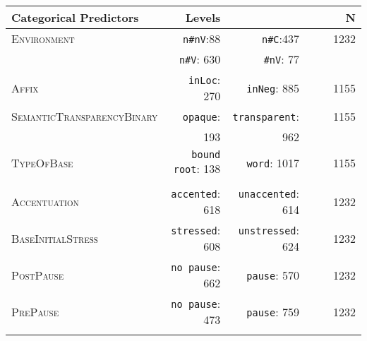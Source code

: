 \begin{table}
{\begin{tabular}{lrrrrr}
				\midrule
				\textbf{Categorical Predictors }& Levels &   &  & &N  \\ 
				\midrule
				\textsc{Environment}       & \texttt{n\#nV}:88  &   \texttt{n\#C}:437   & && 1232\\ 
				& \texttt{n\#V}: 630  & \texttt{\#nV}: 77  &&& \\ 		
				\textsc{Affix}        &\texttt{inLoc}: 270 & \texttt{inNeg}: 885 & &&1155 \\ 	
				\textsc{SemanticTransparencyBinary}        & \texttt{opaque}: & \texttt{transparent}: && & 1155\\ 
				& 193& 962&& & \\ 
				\textsc{TypeOfBase}        &\texttt{ bound root}: 138& \texttt{ word}: 1017& &&  1155\\ 	
				&& & && \\ 			
				\textsc{Accentuation}       &\texttt{accented}: 618 & \texttt{unaccented}: 614 & && 1232 \\ 
				\textsc{BaseInitialStress}       &\texttt{stressed}: 608 & \texttt{unstressed}: 624 & & & 1232\\ 		
				\textsc{PostPause}       &\texttt{no pause}: 662 & \texttt{pause}: 570 & && 1232 \\ 
				\textsc{PrePause}       &\texttt{no pause}: 473 & \texttt{pause}: 759 & & & 1232\\ 
				\lspbottomrule 
			\end{tabular}
		}
	

\end{table}



